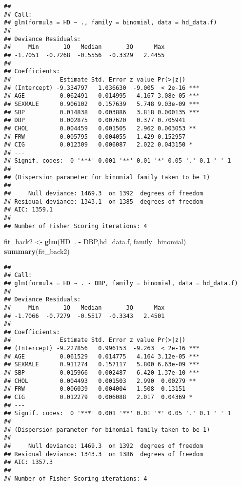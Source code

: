 \documentclass[]{article}
\newenvironment{Shaded}{\begin{snugshade}}{\end{snugshade}}
\newcommand{\KeywordTok}[1]{\textcolor[rgb]{0.13,0.29,0.53}{\textbf{#1}}}
\newcommand{\DataTypeTok}[1]{\textcolor[rgb]{0.13,0.29,0.53}{#1}}
\newcommand{\StringTok}[1]{\textcolor[rgb]{0.31,0.60,0.02}{#1}}
\newcommand{\OperatorTok}[1]{\textcolor[rgb]{0.81,0.36,0.00}{\textbf{#1}}}
\newcommand{\NormalTok}[1]{#1}
\begin{document}
\begin{verbatim}
## 
## Call:
## glm(formula = HD ~ ., family = binomial, data = hd_data.f)
## 
## Deviance Residuals: 
##     Min       1Q   Median       3Q      Max  
## -1.7051  -0.7268  -0.5556  -0.3329   2.4455  
## 
## Coefficients:
##              Estimate Std. Error z value Pr(>|z|)    
## (Intercept) -9.334797   1.036630  -9.005  < 2e-16 ***
## AGE          0.062491   0.014995   4.167 3.08e-05 ***
## SEXMALE      0.906102   0.157639   5.748 9.03e-09 ***
## SBP          0.014838   0.003886   3.818 0.000135 ***
## DBP          0.002875   0.007620   0.377 0.705941    
## CHOL         0.004459   0.001505   2.962 0.003053 ** 
## FRW          0.005795   0.004055   1.429 0.152957    
## CIG          0.012309   0.006087   2.022 0.043150 *  
## ---
## Signif. codes:  0 '***' 0.001 '**' 0.01 '*' 0.05 '.' 0.1 ' ' 1
## 
## (Dispersion parameter for binomial family taken to be 1)
## 
##     Null deviance: 1469.3  on 1392  degrees of freedom
## Residual deviance: 1343.1  on 1385  degrees of freedom
## AIC: 1359.1
## 
## Number of Fisher Scoring iterations: 4
\end{verbatim}

\begin{Shaded}
\begin{Highlighting}[]
\NormalTok{fit_back2 <-}\StringTok{ }\KeywordTok{glm}\NormalTok{(HD}\OperatorTok{~}\NormalTok{. }\OperatorTok{-}\StringTok{ }\NormalTok{DBP,hd_data.f, }\DataTypeTok{family=}\NormalTok{binomial)}
\KeywordTok{summary}\NormalTok{(fit_back2)}
\end{Highlighting}
\end{Shaded}

\begin{verbatim}
## 
## Call:
## glm(formula = HD ~ . - DBP, family = binomial, data = hd_data.f)
## 
## Deviance Residuals: 
##     Min       1Q   Median       3Q      Max  
## -1.7066  -0.7279  -0.5517  -0.3343   2.4501  
## 
## Coefficients:
##              Estimate Std. Error z value Pr(>|z|)    
## (Intercept) -9.227856   0.996153  -9.263  < 2e-16 ***
## AGE          0.061529   0.014775   4.164 3.12e-05 ***
## SEXMALE      0.911274   0.157117   5.800 6.63e-09 ***
## SBP          0.015966   0.002487   6.420 1.37e-10 ***
## CHOL         0.004493   0.001503   2.990  0.00279 ** 
## FRW          0.006039   0.004004   1.508  0.13151    
## CIG          0.012279   0.006088   2.017  0.04369 *  
## ---
## Signif. codes:  0 '***' 0.001 '**' 0.01 '*' 0.05 '.' 0.1 ' ' 1
## 
## (Dispersion parameter for binomial family taken to be 1)
## 
##     Null deviance: 1469.3  on 1392  degrees of freedom
## Residual deviance: 1343.3  on 1386  degrees of freedom
## AIC: 1357.3
## 
## Number of Fisher Scoring iterations: 4
\end{verbatim}
\end{document}
